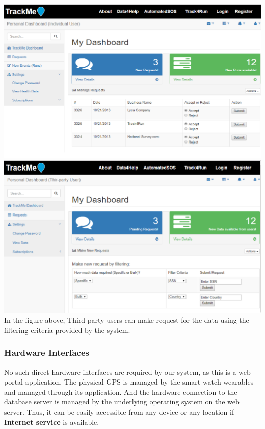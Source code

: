 \documentclass[12pt]{article}
\begin{document}
\includegraphics[scale=0.6]{../Assets/Individual_Request.png}\\
\includegraphics[scale=0.6]{../Assets/Make_Request.png}\\
In the figure above, Third party users can make request for the data using the filtering criteria provided by the system.



\subsubsection{Hardware Interfaces}
No such direct hardware interfaces are required by our system, as this is a web portal application. The physical GPS is managed by the smart-watch wearables and managed through its application. And the hardware connection to the database server is managed by the underlying operating system on the web server. Thus, it can be easily accessible from any device or any location if \textbf{Internet service} is available.
\end{document}
